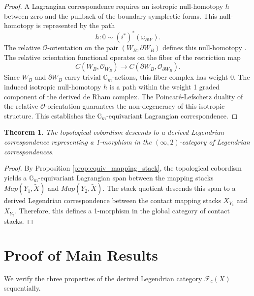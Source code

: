 \documentclass[reqno]{amsart}
\newcommand{\Gm}{\mathbb{G}_m}
\newcommand{\cO}{\mathcal{O}}
\newtheorem{theorem}{Theorem}[section]
\begin{document}
\begin{proof}
A Lagrangian correspondence requires an isotropic null-homotopy $h$ between zero and the pullback of the boundary symplectic forms. This null-homotopy is represented by the path
\[
    h \colon 0 \sim (i^*)^* (\omega_{\partial W}).
\]
The relative $\cO$-orientation on the pair $(W_B, \partial W_B)$ defines this null-homotopy \cite[Section 2.1]{PTVV}. The relative orientation functional operates on the fiber of the restriction map
\[
    C(W_B, \cO_{W_B}) \to C(\partial W_B, \cO_{\partial W_B}).
\]
Since $W_B$ and $\partial W_B$ carry trivial $\Gm$-actions, this fiber complex has weight 0. The induced isotropic null-homotopy $h$ is a path within the weight 1 graded component of the derived de Rham complex. The Poincaré-Lefschetz duality of the relative $\cO$-orientation guarantees the non-degeneracy of this isotropic structure. This establishes the $\Gm$-equivariant Lagrangian correspondence.
\end{proof}

\begin{theorem}\label{thm:surgery}
The topological cobordism descends to a derived Legendrian correspondence representing a 1-morphism in the $(\infty, 2)$-category of Legendrian correspondences.
\end{theorem}

\begin{proof}
By Proposition \ref{prop:equiv_mapping_stack}, the topological cobordism yields a $\Gm$-equivariant Lagrangian span between the mapping stacks $Map(Y_{1}, \widetilde{X})$ and $Map(Y_{2}, \widetilde{X})$. The stack quotient descends this span to a derived Legendrian correspondence between the contact mapping stacks $X_{Y_1}$ and $X_{Y_2}$. Therefore, this defines a 1-morphism in the global category of contact stacks.

\end{proof}

\section{Proof of Main Results}\label{sec:proof}

\noindent We verify the three properties of the derived Legendrian category $\mathcal{F}_{c}(X)$ sequentially.
\end{document}
